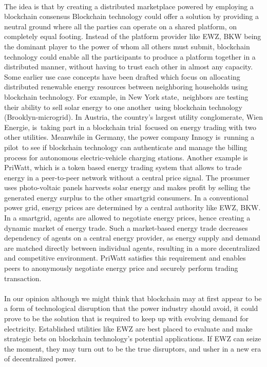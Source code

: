 \documentclass{scrartcl}
\begin{document}
    \paragraph{}
    The idea is that by creating a distributed marketplace powered by employing a blockchain consensus Blockchain technology could offer a solution by providing a neutral ground where all the parties can operate on a shared platform, on completely equal footing. Instead of the platform provider like EWZ, BKW being the dominant player to the power of whom all others must submit, blockchain technology could enable all the participants to produce a platform together in a distributed manner, without having to trust each other in almost any capacity. Some earlier use case concepts have been drafted which focus on allocating distributed renewable energy resources between neighboring households using blockchain technology. For example, in New York state, neighbors are testing their ability to sell solar energy to one another using blockchain technology (Brooklyn-microgrid). In Austria, the country’s largest utility conglomerate, Wien Energie, is taking part in a blockchain trial focused on energy trading with two other utilities. Meanwhile in Germany, the power company Innogy is running a pilot to see if blockchain technology can authenticate and manage the billing process for autonomous electric-vehicle charging stations. Another example is PriWatt, which is a token based energy trading system that allows to trade energy in a peer-to-peer network without a central price signal. The prosumer uses photo-voltaic panels harvests solar energy and makes profit by selling the generated energy surplus to the other smartgrid consumers. In a conventional power grid, energy prices are determined by a central authority like EWZ, BKW. In a smartgrid, agents are allowed to negotiate energy prices, hence creating a dynamic market of energy trade. Such a market-based energy trade decreases dependency of agents on a central energy provider, as energy supply and demand are matched directly between individual agents, resulting in a more decentralized and competitive environment. PriWatt satisfies this requirement and enables peers to anonymously negotiate energy price and securely perform trading transaction.
    
    \paragraph{}
    In our opinion although we might think that blockchain may at first appear to be a form of technological disruption that the power industry should avoid, it could prove to be the solution that is required to keep up with evolving demand for electricity. Established utilities like EWZ are best placed to evaluate and make strategic bets on blockchain technology’s potential applications. If EWZ can seize the moment, they may turn out to be the true disruptors, and usher in a new era of decentralized power.
	
\end{document}
